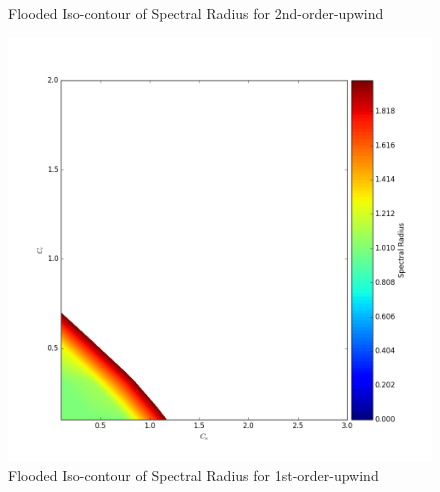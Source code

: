 \documentclass[12pt]{article}
\newenvironment{problem}[2][Problem]{\begin{trivlist}
\item[\hskip \labelsep {\bfseries #1}\hskip \labelsep {\bfseries #2.}]}{\end{trivlist}}
\begin{document}
\begin{problem}{2}
\begin{figure}[H]
 \caption{Flooded Iso-contour of Spectral Radius for 2nd-order-upwind}
\label{label}
\end{figure}
\begin{figure}[H]
\centering
  \includegraphics[scale=0.35]{p2e_contours_u1st.png}
 \caption{Flooded Iso-contour of Spectral Radius for 1st-order-upwind}
\label{label}
\end{figure}
\end{problem}
\end{document}
